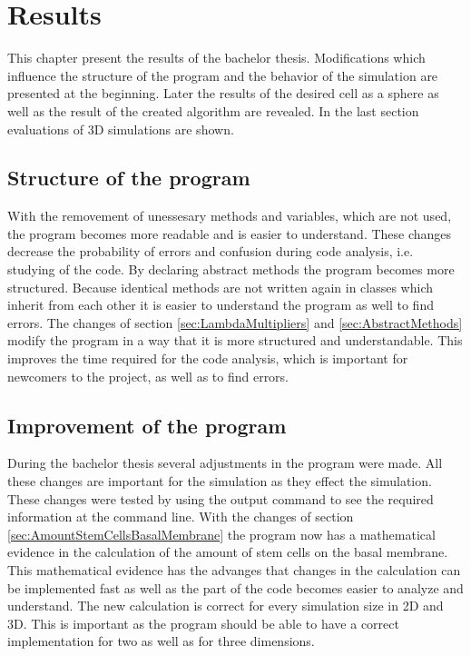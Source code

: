 \chapter{Results}
This chapter present the results of the bachelor thesis. Modifications which influence the structure of the program and the behavior of the simulation are presented at the beginning. Later the results of the desired cell as a sphere as well as the result of the created algorithm are revealed. In the last section evaluations of 3D simulations are shown.

\section{Structure of the program}
With the removement of unessesary methods and variables, which are not used, the program becomes more readable and is easier to understand. These changes decrease the probability of errors and confusion during code analysis, i.e. studying of the code. By declaring abstract methods the program becomes more structured. Because identical methods are not written again in classes which inherit from each other it is easier to understand the program as well to find errors. \newline
The changes of section \ref{sec:LambdaMultipliers} and \ref{sec:AbstractMethods} modify the program in a way that it is more structured and understandable. This improves the time required for the code analysis, which is important for newcomers to the project, as well as to find errors. 

\section{Improvement of the program}
During the bachelor thesis several adjustments in the program were made. All these changes are important for the simulation as they effect the simulation. These changes were tested by using the output command to see the required information at the command line. \newline
With the changes of section \ref{sec:AmountStemCellsBasalMembrane} the program now has a mathematical evidence in the calculation of the amount of stem cells on the basal membrane. This mathematical evidence has the advanges that changes in the calculation can be implemented fast as well as the part of the code becomes easier to analyze and understand. The new calculation is correct for every simulation size in 2D and 3D. This is important as the program should be able to have a correct implementation for two as well as for three dimensions.

